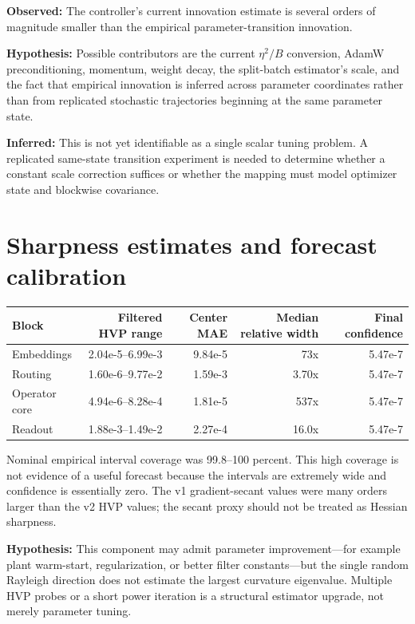 \documentclass[10pt,letterpaper]{article}
\newcommand{\obs}{\textbf{Observed:} }
\newcommand{\infv}{\textbf{Inferred:} }
\newcommand{\hyp}{\textbf{Hypothesis:} }
\begin{document}
\obs The controller's current innovation estimate is several orders of
magnitude smaller than the empirical parameter-transition innovation.

\hyp Possible contributors are the current $\eta^2/B$ conversion, AdamW
preconditioning, momentum, weight decay, the split-batch estimator's scale,
and the fact that empirical innovation is inferred across parameter
coordinates rather than from replicated stochastic trajectories beginning at
the same parameter state.

\infv This is not yet identifiable as a single scalar tuning problem.  A
replicated same-state transition experiment is needed to determine whether a
constant scale correction suffices or whether the mapping must model optimizer
state and blockwise covariance.

\section{Sharpness estimates and forecast calibration}

\begin{center}
\small
\begin{tabular}{lrrrr}
\toprule
Block & Filtered HVP range & Center MAE & Median relative width & Final confidence \\
\midrule
Embeddings & 2.04e-5--6.99e-3 & 9.84e-5 & 73x & 5.47e-7 \\
Routing & 1.60e-6--9.77e-2 & 1.59e-3 & 3.70x & 5.47e-7 \\
Operator core & 4.94e-6--8.28e-4 & 1.81e-5 & 537x & 5.47e-7 \\
Readout & 1.88e-3--1.49e-2 & 2.27e-4 & 16.0x & 5.47e-7 \\
\bottomrule
\end{tabular}
\end{center}

Nominal empirical interval coverage was 99.8--100 percent.  This high coverage
is not evidence of a useful forecast because the intervals are extremely
wide and confidence is essentially zero.  The v1 gradient-secant values were
many orders larger than the v2 HVP values; the secant proxy should not be
treated as Hessian sharpness.

\hyp This component may admit parameter improvement---for example plant
warm-start, regularization, or better filter constants---but the single random
Rayleigh direction does not estimate the largest curvature eigenvalue.
Multiple HVP probes or a short power iteration is a structural estimator
upgrade, not merely parameter tuning.
\end{document}
